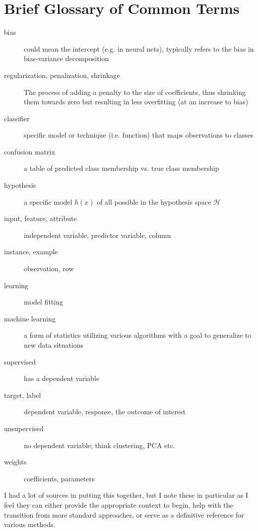 \documentclass[english,nohyper,titlepage]{tufte-handout}\usepackage{knitr}
\begin{document}
\part{Brief Glossary of Common Terms}
\begin{description}
  \item[bias] could mean the intercept (e.g. in neural nets), typically refers to the bias in bias-variance decomposition
  \item[regularization, penalization, shrinkage] The process of adding a penalty to the size of coefficients, thus shrinking them towards zero but resulting in less overfitting (at an increase to bias)
  \item[classifier] specific model or technique (i.e. function) that maps observations to classes
  \item[confusion matrix] a table of predicted class membership vs. true class membership
  \item[hypothesis] a specific model $h(x)$ of all possible in the hypothesis space $\mathcal{H}$
  \item[input, feature, attribute] independent variable, predictor variable, column
  \item[instance, example] observation, row
  \item[learning] model fitting
  \item[machine learning] a form of statistics utilizing various algorithms with a goal to generalize to new data situations
  \item[supervised] has a dependent variable
  \item[target, label] dependent variable, response, the outcome of interest
  \item[unsupervised] no dependent variable; think clustering, PCA etc.
  \item[weights]  coefficients, parameters
\end{description}









\pagebreak




I had a lot of sources in putting this together, but I note these in particular as I feel they can either provide the appropriate context to begin, help with the transition from more standard approaches, or serve as a definitive reference for various methods.

\nocite{breiman_statistical_2001}
\nocite{wood_generalized_2006}
\nocite{hastie_elements_2009}
\nocite{harrell_regression_2001}
\nocite{domingos_few_2012} %
\nocite{murphy_machine_2012}
\end{document}
